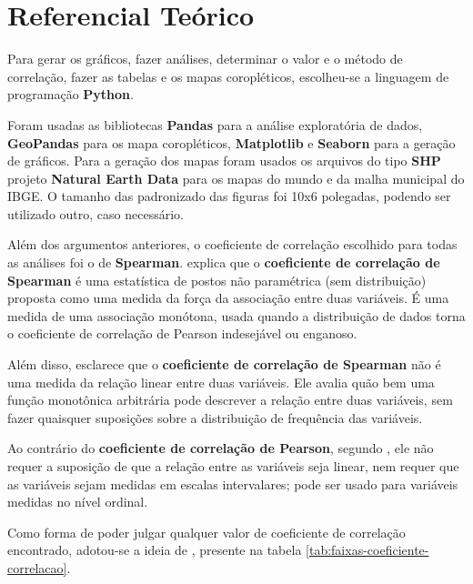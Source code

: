 \chapter{Referencial Teórico}

Para gerar os gráficos, fazer análises, determinar o valor e o método de correlação, fazer as tabelas e os mapas coropléticos, escolheu-se a linguagem de programação \textbf{Python}.

Foram usadas as bibliotecas \textbf{Pandas} para a análise exploratória de dados, \textbf{GeoPandas} para os mapa coropléticos, \textbf{Matplotlib} e \textbf{Seaborn} para a geração  de gráficos. Para a geração dos mapas foram usados os arquivos do tipo \textbf{SHP} projeto \textbf{Natural Earth Data} para os mapas do mundo e da malha municipal do IBGE. O tamanho das padronizado das figuras foi 10x6 polegadas, podendo ser utilizado outro, caso necessário.

Além dos argumentos anteriores, o coeficiente de correlação escolhido para todas as análises foi o de \textbf{Spearman}. \cite{hauke2011comparison} explica que o \textbf{coeficiente de correlação de Spearman} é uma estatística de postos não paramétrica (sem distribuição) proposta como uma medida da força da associação entre duas variáveis. É uma medida de uma associação monótona, usada quando a distribuição de dados torna o coeficiente de correlação de Pearson indesejável ou enganoso. 

Além disso, \cite{hauke2011comparison} esclarece que o \textbf{coeficiente de correlação de Spearman} não é uma medida da relação linear entre duas variáveis. Ele avalia quão bem uma função monotônica arbitrária pode descrever a relação entre duas variáveis, sem fazer quaisquer suposições sobre a distribuição de frequência das variáveis.

Ao contrário do \textbf{coeficiente de correlação de Pearson}, segundo \cite{hauke2011comparison}, ele não requer a suposição de que a relação entre as variáveis seja linear, nem requer que as variáveis sejam medidas em escalas intervalares; pode ser usado para variáveis medidas no nível ordinal.

Como forma de poder julgar qualquer valor de coeficiente de correlação encontrado, adotou-se a ideia de \cite{ali2022spearman}, presente na tabela \ref{tab:faixas-coeficiente-correlacao}.


